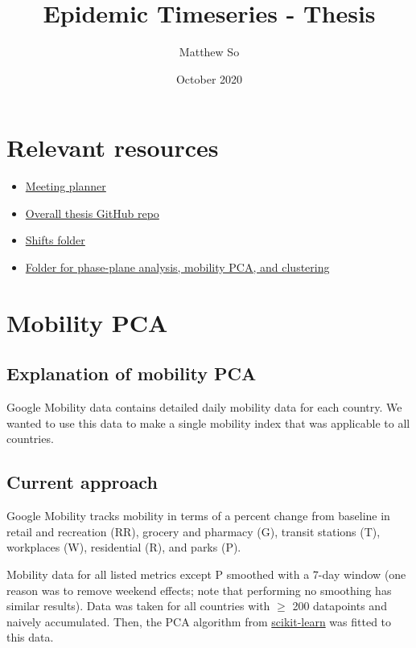 \documentclass{article}
\title{Epidemic Timeseries - Thesis}
\author{Matthew So}
\date{October 2020}
\begin{document}
\maketitle

\tableofcontents


\section{Relevant resources}

\begin{itemize}
    \item \hyperlink{https://docs.google.com/document/d/105QZAGMzl7m6JZiXGLuycXWrZcsydqJ_/edit}{Meeting planner} 
    \item \hyperlink{https://github.com/Apeirogons/COVID-math-thesis}{Overall thesis GitHub repo}
    \item \hyperlink{https://github.com/Apeirogons/COVID-math-thesis/tree/master/shifts}{Shifts folder}
    \item \hyperlink{https://github.com/Apeirogons/COVID-math-thesis/tree/master/epidemic_timeseries}{Folder for phase-plane analysis, mobility PCA, and clustering}    
\end{itemize}



\section{Mobility PCA}
\subsection{Explanation of mobility PCA}
Google Mobility data contains detailed daily mobility data for each country. We wanted to use this data to make a single mobility index that was applicable to all countries.

\subsection{Current approach}

Google Mobility tracks mobility in terms of a percent change from baseline in retail and recreation (RR), grocery and pharmacy (G), transit stations (T), workplaces (W), residential (R), and parks (P).

Mobility data for all listed metrics except P smoothed with a 7-day window (one reason was to remove weekend effects; note that performing no smoothing has similar results). Data was taken for all countries with $\geq$ 200 datapoints and naively accumulated. Then, the PCA algorithm from \href{https://scikit-learn.org/stable/}{scikit-learn} was fitted to this data. 
\end{document}
